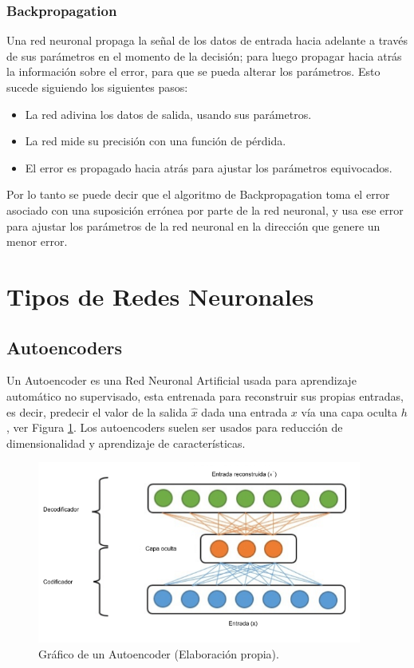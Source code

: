 \subsubsection{Backpropagation}

Una red neuronal propaga la se\~{n}al de los datos de entrada hacia adelante a trav\'{e}s de sus par\'{a}metros en el momento de la decisi\'{o}n; para luego propagar hacia atr\'{a}s la informaci\'{o}n sobre el error, para que se pueda alterar los par\'{a}metros. Esto sucede siguiendo los siguientes pasos:

\begin{itemize}
\item La red adivina los datos de salida, usando sus par\'{a}metros.
\item La red mide su precisi\'{o}n con una funci\'{o}n de p\'{e}rdida.
\item El error es propagado hacia atr\'{a}s para ajustar los par\'{a}metros equivocados.
\end{itemize}

Por lo tanto se puede decir que el algoritmo de Backpropagation toma el error asociado con una suposición errónea por parte de la red neuronal, y usa ese error para ajustar los parámetros de la red neuronal en la dirección que genere un menor error.

\section{Tipos de Redes Neuronales}

\subsection{Autoencoders}

Un Autoencoder es una Red Neuronal Artificial usada para aprendizaje autom\'{a}tico no supervisado, esta entrenada para reconstruir sus propias entradas, es decir, predecir el valor de la salida $\hat{x}$ dada una entrada $x$ v\'{i}a una capa oculta $h$, ver Figura \ref{fig:autoencoder1}. Los autoencoders suelen ser usados para reducci\'{o}n de dimensionalidad y aprendizaje de caracter\'{i}sticas. 

\begin{figure}[h!]
  \begin{center}	\includegraphics[width=0.95\textwidth, frame]{imagenes/Cap4/autoencoder}
  \caption{Gr\'{a}fico de un Autoencoder (Elaboraci\'{o}n propia).}
  \label{fig:autoencoder1}
  \end{center}
\end{figure}

